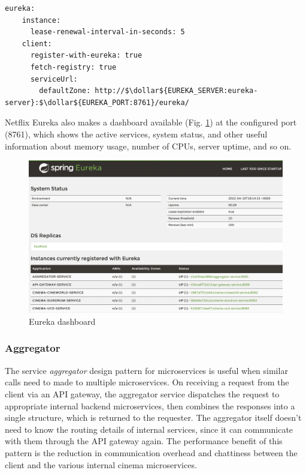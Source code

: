\begin{lstlisting}[caption=Snippet from a Eureka client's application properties]
  eureka:
    instance:
      lease-renewal-interval-in-seconds: 5
    client:
      register-with-eureka: true
      fetch-registry: true
      serviceUrl:
        defaultZone: http://$\dollar${EUREKA_SERVER:eureka-server}:$\dollar${EUREKA_PORT:8761}/eureka/
\end{lstlisting}

Netflix Eureka also makes a dashboard available (Fig. \ref{fig:eureka-dashboard}) at the configured port (8761), which shows the active services, system status, and other useful information about memory usage, number of CPUs, server uptime, and so on.

\begin{figure}[H]
  \centering
  \includegraphics[width=1.0\linewidth]{./assets/images/case-studies/eureka-dashboard.png}
  \caption{Eureka dashboard}
  \label{fig:eureka-dashboard}
\end{figure}

\subsubsection{Aggregator}

The service \textit{aggregator} design pattern for microservices is useful when similar calls need to made to multiple microservices. On receiving a request from the client via an API gateway, the aggregator service dispatches the request to appropriate internal backend microservices, then combines the responses into a single structure, which is returned to the requester. The aggregator itself doesn't need to know the routing details of internal services, since it can communicate with them through the API gateway again. The performance benefit of this pattern is the reduction in communication overhead and chattiness between the client and the various internal cinema microservices.


